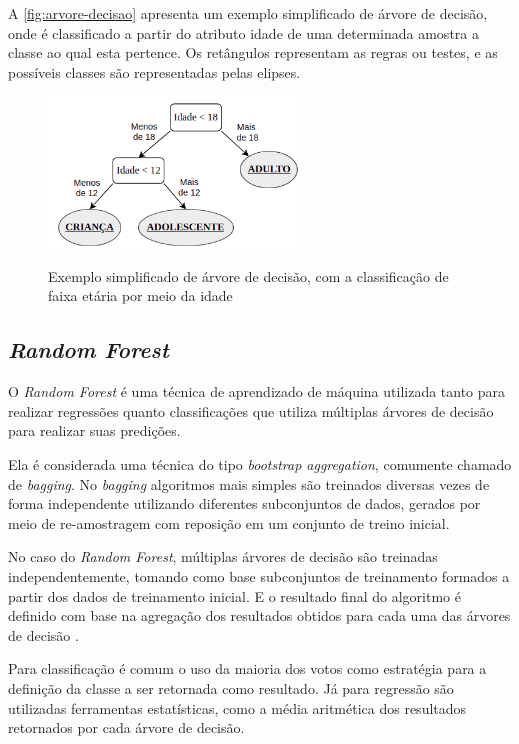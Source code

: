 A \autoref{fig:arvore-decisao} apresenta um exemplo simplificado de árvore de decisão, onde é classificado a partir do atributo idade de uma determinada amostra a classe ao qual esta pertence. Os retângulos representam as regras ou testes, e as possíveis classes são representadas pelas elipses.

\begin{figure}[!htb]
    \centering
    \caption{Exemplo simplificado de árvore de decisão, com a classificação de faixa etária por meio da idade}
    \includegraphics[width=0.6\textwidth]{./dados/figuras/proposta/arvore-decisao}
    \label{fig:arvore-decisao}
\end{figure}
    
\subsection{\textit{Random Forest}}
\label{ssec:randomForest}

O \textit{Random Forest} é uma técnica de aprendizado de máquina utilizada tanto para realizar regressões quanto classificações que utiliza múltiplas árvores de decisão para realizar suas predições.

Ela é considerada uma técnica do tipo \textit{bootstrap aggregation}, comumente chamado de \textit{bagging}. No \textit{bagging} algoritmos mais simples são treinados diversas vezes de forma independente utilizando diferentes subconjuntos de dados, gerados por meio de re-amostragem com reposição em um conjunto de treino inicial.

No caso do \textit{Random Forest}, múltiplas árvores de decisão são treinadas independentemente, tomando como base subconjuntos de treinamento formados a partir dos dados de treinamento inicial. 
E o resultado final do algoritmo é definido com base na agregação dos resultados obtidos para cada uma das árvores de decisão \cite{Liaw2002}.

Para classificação é comum o uso da maioria dos votos como estratégia para a definição da classe a ser retornada como resultado. Já para regressão são utilizadas ferramentas estatísticas, como a média aritmética dos resultados retornados por cada árvore de decisão.

